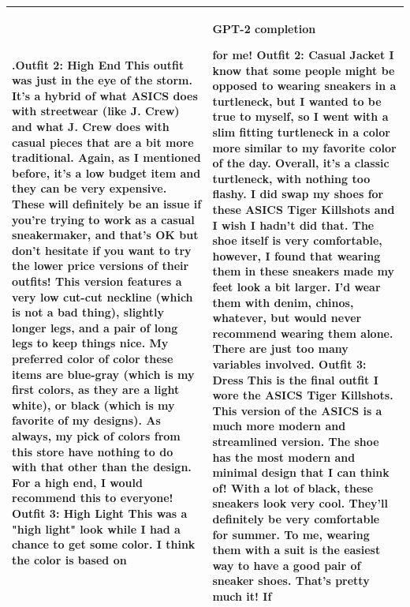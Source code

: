 \documentclass{article}
\begin{document}
\begin{table}[t]
\begin{center}
\begin{tabular}{|p{8cm}|p{8cm}|}
 .\newline\newline Outfit 2: High End \newline\newline This outfit was just in the eye of the storm. It's a hybrid of what ASICS does with streetwear (like J. Crew) and what J. Crew does with casual pieces that are a bit more traditional. Again, as I mentioned before, it's a low budget item and they can be very expensive. These will definitely be an issue if you're trying to work as a casual sneakermaker, and that's OK but don't hesitate if you want to try the lower price versions of their outfits! \newline\newline This version features a very low cut-cut neckline (which is not a bad thing), slightly longer legs, and a pair of long legs to keep things nice. My preferred color of color these items are blue-gray (which is my first colors, as they are a light white), or black (which is my favorite of my designs). As always, my pick of colors from this store have nothing to do with that other than the design. For a high end, I would recommend this to everyone! \newline\newline Outfit 3: High Light \newline\newline This was a "high light" look while I had a chance to get some color. I think the color is based on

  &
  \centerline{\textbf{GPT-2 completion}}
 for me! \newline \newline Outfit 2: Casual Jacket  \newline \newline I know that some people might be opposed to wearing sneakers in a turtleneck, but I wanted to be true to myself, so I went with a slim fitting turtleneck in a color more similar to my favorite color of the day. Overall, it's a classic turtleneck, with nothing too flashy. I did swap my shoes for these ASICS Tiger Killshots and I wish I hadn't did that. The shoe itself is very comfortable, however, I found that wearing them in these sneakers made my feet look a bit larger. I'd wear them with denim, chinos, whatever, but would never recommend wearing them alone. There are just too many variables involved. \newline \newline Outfit 3: Dress \newline \newline This is the final outfit I wore the ASICS Tiger Killshots. This version of the ASICS is a much more modern and streamlined version. The shoe has the most modern and minimal design that I can think of! With a lot of black, these sneakers look very cool. They'll definitely be very comfortable for summer.  \newline \newline To me, wearing them with a suit is the easiest way to have a good pair of sneaker shoes. That's pretty much it! If
 \\
\hline



\end{tabular}
\end{center}
\end{table}
\end{document}
